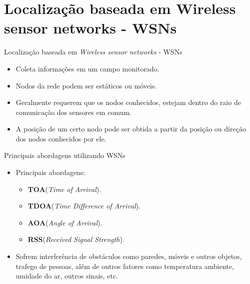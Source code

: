 \documentclass{beamer}
\newlength{\wideitemsep}
\let\olditem\item
\renewcommand{\item}{\setlength{\itemsep}{\wideitemsep}\olditem}
\begin{document}
\section{Localização baseada em Wireless sensor networks - WSNs}

\begin{frame}{Localização baseada em \textit{Wireless sensor networks} - WSNs}
\begin{itemize}
 \item Coleta informações em um campo monitorado.
 \item Nodos da rede podem ser estáticos ou móveis.
 \item Geralmente requerem que os nodos conhecidos, estejam dentro 
	do raio de comunicação dos sensores em comum.
  \item A posição de um certo nodo pode ser obtida 
  a partir da posição ou direção dos nodos conhecidos por ele.
\end{itemize}
\end{frame}

\begin{frame}{Principais abordagens utilizando WSNs}
\begin{itemize}
  \item Principais abordagens:
    \begin{itemize}
     \item \textbf{TOA}(\textit{Time of Arrival}).
     \item \textbf{TDOA}(\textit{Time Difference of Arrival}).
     \item \textbf{AOA}(\textit{Angle of Arrival}).
     \item \textbf{RSS}(\textit{Received Signal Strength}).
    \end{itemize}

 \item Sofrem interferência de obstáculos como paredes, 
   móveis e outros objetos, trafego de pessoas, além de outros fatores como temperatura ambiente, 
   umidade do ar, outros sinais, etc.
\end{itemize}
\end{frame}
\end{document}
